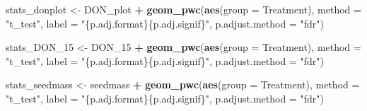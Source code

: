 \documentclass[
]{article}
\newenvironment{Shaded}{\begin{snugshade}}{\end{snugshade}}
\newcommand{\AttributeTok}[1]{\textcolor[rgb]{0.13,0.29,0.53}{#1}}
\newcommand{\FunctionTok}[1]{\textcolor[rgb]{0.13,0.29,0.53}{\textbf{#1}}}
\newcommand{\NormalTok}[1]{#1}
\newcommand{\OtherTok}[1]{\textcolor[rgb]{0.56,0.35,0.01}{#1}}
\newcommand{\SpecialCharTok}[1]{\textcolor[rgb]{0.81,0.36,0.00}{\textbf{#1}}}
\newcommand{\StringTok}[1]{\textcolor[rgb]{0.31,0.60,0.02}{#1}}
\begin{document}
\begin{Shaded}
\begin{Highlighting}[]
\NormalTok{stats\_donplot }\OtherTok{\textless{}{-}}\NormalTok{ DON\_plot }\SpecialCharTok{+} 
  \FunctionTok{geom\_pwc}\NormalTok{(}\FunctionTok{aes}\NormalTok{(}\AttributeTok{group =}\NormalTok{ Treatment), }\AttributeTok{method =} \StringTok{"t\_test"}\NormalTok{, }\AttributeTok{label =} \StringTok{"\{p.adj.format\}\{p.adj.signif\}"}\NormalTok{, }\AttributeTok{p.adjust.method =} \StringTok{"fdr"}\NormalTok{)}

\NormalTok{stats\_DON\_15 }\OtherTok{\textless{}{-}}\NormalTok{ DON\_15 }\SpecialCharTok{+} 
  \FunctionTok{geom\_pwc}\NormalTok{(}\FunctionTok{aes}\NormalTok{(}\AttributeTok{group =}\NormalTok{ Treatment), }\AttributeTok{method =} \StringTok{"t\_test"}\NormalTok{, }\AttributeTok{label =} \StringTok{"\{p.adj.format\}\{p.adj.signif\}"}\NormalTok{, }\AttributeTok{p.adjust.method =} \StringTok{"fdr"}\NormalTok{)}

\NormalTok{stats\_seedmass }\OtherTok{\textless{}{-}}\NormalTok{ seedmass }\SpecialCharTok{+} 
  \FunctionTok{geom\_pwc}\NormalTok{(}\FunctionTok{aes}\NormalTok{(}\AttributeTok{group =}\NormalTok{ Treatment), }\AttributeTok{method =} \StringTok{"t\_test"}\NormalTok{, }\AttributeTok{label =} \StringTok{"\{p.adj.format\}\{p.adj.signif\}"}\NormalTok{, }\AttributeTok{p.adjust.method =} \StringTok{"fdr"}\NormalTok{)}
\end{Highlighting}
\end{Shaded}
\end{document}
